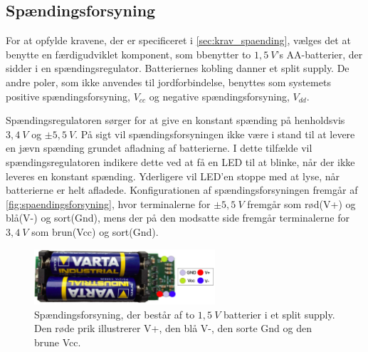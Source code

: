 \subsection{Spændingsforsyning}
For at opfylde kravene, der er specificeret i \autoref{sec:krav_spaending}, vælges det at benytte en færdigudviklet komponent, som bbenytter to $1,5~V$'s AA-batterier, der sidder i en spændingsregulator. Batteriernes kobling danner et split supply. De andre poler, som ikke anvendes til jordforbindelse, benyttes som systemets positive spændingsforsyning, ${V}_{cc}$ og negative spændingsforsyning, ${V}_{dd}$.

Spændingsregulatoren sørger for at give en konstant spænding på henholdsvis $3,4~V$ og $\pm 5,5~V$. På sigt vil spændingsforsyningen ikke være i stand til at levere en jævn spænding grundet afladning af batterierne. I dette tilfælde vil spændingsregulatoren indikere dette ved at få en LED til at blinke, når der ikke leveres en konstant spænding. Yderligere vil LED'en stoppe med at lyse, når batterierne er helt afladede. 
Konfigurationen af spændingsforsyningen fremgår af \autoref{fig:spaendingsforsyning}, hvor terminalerne for $\pm 5,5~V$ fremgår som rød(V+) og blå(V-) og sort(Gnd), mens der på den modsatte side fremgår terminalerne for $3,4~V$ som brun(Vcc) og sort(Gnd). 

\begin{figure}[H]
\centering
\includegraphics[width=0.6\textwidth]{figures/spaendingsforsyning}
\caption{Spændingsforsyning, der består af to $1,5~V$ batterier i et split supply. Den røde prik illustrerer V+, den blå V-, den sorte Gnd og den brune Vcc.}
\label{fig:spaendingsforsyning}
\end{figure}

